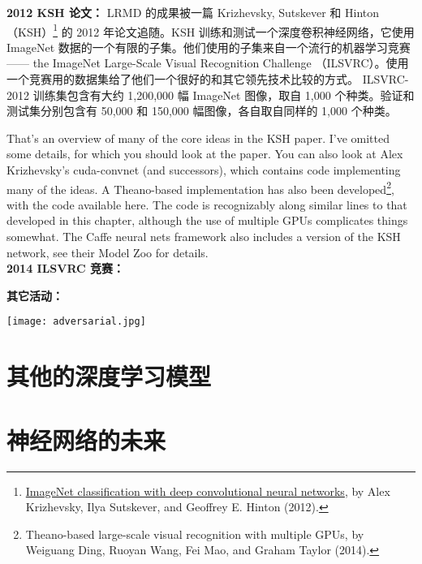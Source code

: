 \textbf{2012 KSH 论文：} LRMD 的成果被一篇 Krizhevsky, Sutskever 和 Hinton 
（KSH）\footnote{\href{http://www.cs.toronto.edu/~fritz/absps/imagenet.pdf}{ImageNet classification with deep convolutional neural networks}, by Alex Krizhevsky, Ilya Sutskever, and Geoffrey E. Hinton (2012).} 的 2012 年论文追随。KSH 训练和测试一个深度卷积神经网络，它使用 ImageNet
数据的一个有限的子集。他们使用的子集来自一个流行的机器学习竞赛 —— the ImageNet Large-Scale Visual Recognition Challenge （ILSVRC）。使用一个竞赛用的数据集给了他们一个很好的和其它领先技术比较的方式。
ILSVRC-2012 训练集包含有大约 1,200,000 幅 ImageNet 图像，取自 1,000 个种类。验证和
测试集分别包含有 50,000 和 150,000 幅图像，各自取自同样的 1,000 个种类。

That's an overview of many of the core ideas in the KSH paper. I've omitted some details, for which you should look at the paper. You can also look at Alex Krizhevsky's cuda-convnet (and successors), which contains code implementing many of the ideas. A Theano-based implementation has also been developed\footnote{Theano-based large-scale visual recognition with multiple GPUs, by Weiguang Ding, Ruoyan Wang, Fei Mao, and Graham Taylor (2014).}, with the code available here. The code is recognizably along similar lines to that developed in this chapter, although the use of multiple GPUs complicates things somewhat. The Caffe neural nets framework also includes a version of the KSH network, see their Model Zoo for details.\\

\textbf{2014 ILSVRC 竞赛：}

\textbf{其它活动：}

\begin{center}
	\texttt{[image: adversarial.jpg]}
\end{center}

\section{其他的深度学习模型}
\label{sec:other_approaches_to_deep_neural_nets}

\section{神经网络的未来}
\label{sec:on_the_future_of_neural_networks}
